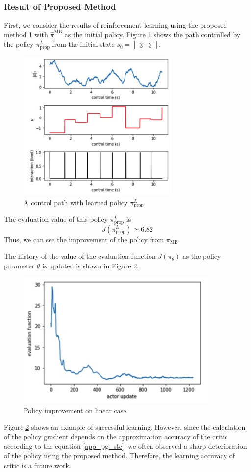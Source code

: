 \documentclass[english, dvipdfmx]{ampmt}             %
\begin{document}
\subsubsection{Result of Proposed Method}
First, we consider the results of reinforcement learning using the proposed method 1 with $\hat{\pi}^{\textrm{MB}}$ as the initial policy. Figure \ref{proposed_1_linear} shows the path controlled by the policy $\pi_{\textrm{prop}}^L$ from the initial state $s_0=\begin{bmatrix}3 & 3\end{bmatrix}$.
\begin{figure}[H]
	\centering
 	\includegraphics[width=8cm]{proposed_1_linear.png}
 	\caption{A control path with learned policy $\pi_{\textrm{prop}}^L$} \label{proposed_1_linear}
\end{figure}
The evaluation value of this policy $\pi_{\textrm{prop}}^L$ is
\begin{equation}
	J(\pi_{\textrm{prop}}^L) \simeq 6.82
\end{equation}
Thus, we can see the improvement of the policy from $\pi_{\textrm{MB}}$.\par
The history of the value of the evaluation function $J( \pi_{\theta})$ as the policy parameter $\theta$ is updated is shown in Figure \ref{evaluation_log_linear}.
\begin{figure}[H]
	\centering
 	\includegraphics[width=10cm]{evaluation_log_linear.png}
 	\caption{Policy improvement on linear case} \label{evaluation_log_linear}
\end{figure}
Figure \ref{evaluation_log_linear} shows an example of successful learning. However, since the calculation of the policy gradient depends on the approximation accuracy of the critic according to the equation \eqref{app_pg_stc}, we often observed a sharp deterioration of the policy using the proposed method. Therefore, the learning accuracy of critic is a future work.
\end{document}
